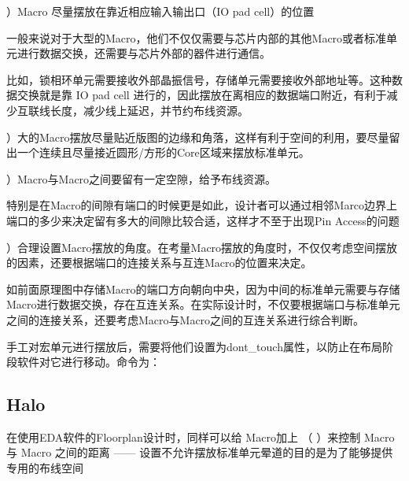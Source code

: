 \documentclass[letterpaper,10pt,english]{sphinxmanual}
\begin{document}
）Macro 尽量摆放在靠近相应输入输出口（IO pad cell）的位置

\sphinxAtStartPar
一般来说对于大型的Macro，他们不仅仅需要与芯片内部的其他Macro或者标准单元进行数据交换，还需要与芯片外部的器件进行通信。

\sphinxAtStartPar
比如，锁相环单元需要接收外部晶振信号，存储单元需要接收外部地址等。这种数据交换就是靠 IO pad cell 进行的，因此摆放在离相应的数据端口附近，有利于减少互联线长度，减少线上延迟，并节约布线资源。

）大的Macro摆放尽量贴近版图的边缘和角落，这样有利于空间的利用，要尽量留出一个连续且尽量接近圆形/方形的Core区域来摆放标准单元。

）Macro与Macro之间要留有一定空隙，给予布线资源。

\sphinxAtStartPar
特别是在Macro的间隙有端口的时候更是如此，设计者可以通过相邻Marco边界上端口的多少来决定留有多大的间隙比较合适，这样才不至于出现Pin Access的问题

）合理设置Macro摆放的角度。在考量Macro摆放的角度时，不仅仅考虑空间摆放的因素，还要根据端口的连接关系与互连Macro的位置来决定。

\sphinxAtStartPar
如前面原理图中存储Macro的端口方向朝向中央，因为中间的标准单元需要与存储Macro进行数据交换，存在互连关系。在实际设计时，不仅要根据端口与标准单元之间的连接关系，还要考虑Macro与Macro之间的互连关系进行综合判断。

\sphinxAtStartPar
手工对宏单元进行摆放后，需要将他们设置为dont\_touch属性，以防止在布局阶段软件对它进行移动。命令为：

\begin{sphinxVerbatim}[commandchars=\\\{\},numbers=left,firstnumber=1,stepnumber=1]
\end{sphinxVerbatim}


\subsection{Halo}
\label{\detokenize{chapter5/_u5e03_u5c40Macro:halo}}
\sphinxAtStartPar
在使用EDA软件的Floorplan设计时，同样可以给 Macro加上  （  ）来控制 Macro 与 Macro 之间的距离 —— 设置不允许摆放标准单元晕道的目的是为了能够提供专用的布线空间
\begin{quote}

\begin{figure}[htbp]
\centering

\noindent{}
\end{figure}
\end{quote}
\end{document}
